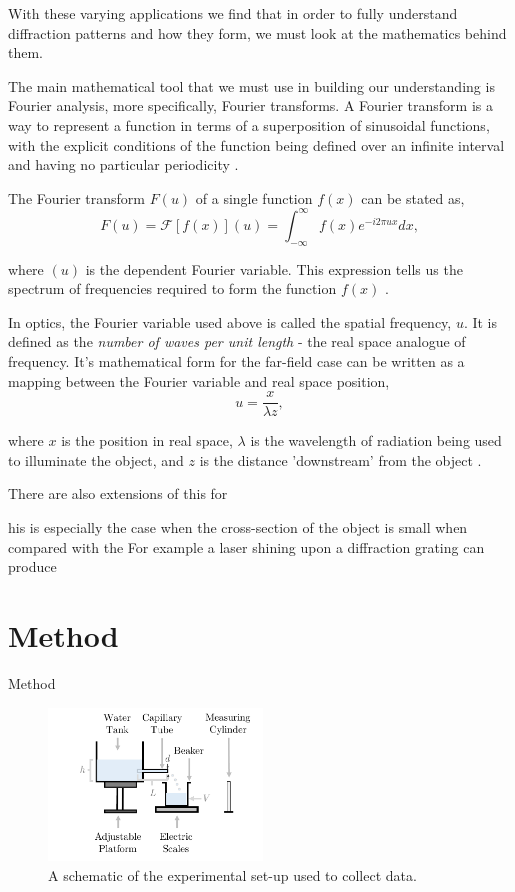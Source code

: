\documentclass[twocolumn]{revtex4}
\begin{document}
With these varying applications we find that in order to fully understand diffraction patterns and how they form, we must look at the mathematics behind them. 

The main mathematical tool that we must use in building our understanding is Fourier analysis, more specifically, Fourier transforms. A Fourier transform is a way to represent a function in terms of a superposition of sinusoidal functions, with the explicit conditions of the function being defined over an infinite interval and having no particular periodicity \cite{mathmethods}.

The Fourier transform $F(u)$ of a single function $f(x)$ can be stated as,
\begin{equation}
F(u) = \mathcal{F}[f(x)](u) = \int_{-\infty}^\infty f(x) e^{-i2\pi ux}dx,
\end{equation}

where $(u)$ is the dependent Fourier variable. This expression tells us the spectrum of frequencies required to form the function $f(x)$ \cite{of2f}.

In optics, the Fourier variable used above is called the spatial frequency, $u$. It is defined as the \textsl{number of waves per unit length} - the real space analogue of frequency. It's mathematical form for the far-field case can be written as a mapping between the Fourier variable and real space position,
\begin{equation}
u=\frac{x}{\lambda z},
\end{equation}

where $x$ is the position in real space, $\lambda$ is the wavelength of radiation being used to illuminate the object, and $z$ is the distance 'downstream' from the object \cite{of2f}.

There are also extensions of this for 

his is especially the case when the cross-section of the object is small when compared with the  For example a laser shining upon a diffraction grating can produce


\vspace{-3ex}
\section{Method} 
\vspace{-2ex}

Method

\begin{figure}[!h]
\begin{center}
\includegraphics[width=5.7cm]{results/fig1}
\caption[]{A schematic of the experimental set-up used to collect data. }
\label{fig:fig1}
\end{center}
\end{figure}
\end{document}
